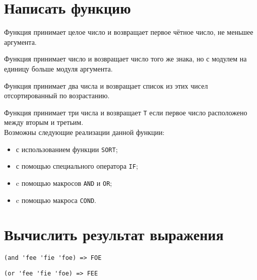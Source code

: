 
\section{Написать функцию}

\problem Функция принимает целое число и возвращает первое чётное число, не меньшее аргумента.



\problem Функция принимает число и возвращает число того же знака, но с модулем на единицу больше модуля аргумента.



\problem Функция принимает два числа и возвращает список из этих чисел отсортированный по возрастанию.



\problem Функция принимает три числа и возвращает \verb|T| если первое число расположено между вторым и третьим.\\

\noindent
Возможны следующие реализации данной функции:
\begin{itemize}
	\item с использованием функции \verb|SORT|;
	
	\item с помощью специального оператора \verb|IF|;
	
	\item c помощью макросов \verb|AND| и \verb|OR|;
	
	\item c помощью макроса \verb|COND|.
\end{itemize}



\section{Вычислить результат выражения}

\problem \hfill
\begin{lstlisting}
(and 'fee 'fie 'foe) => FOE
\end{lstlisting}


\problem \hfill
\begin{lstlisting}
(or 'fee 'fie 'foe) => FEE
\end{lstlisting}


